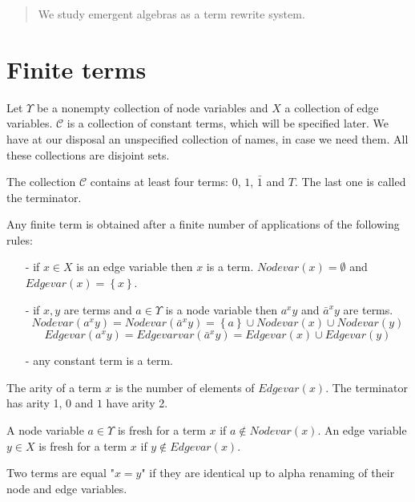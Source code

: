 \documentclass{article}
\begin{document}
\date{This version: 21.05.2018}






\maketitle


\begin{abstract}
We study emergent algebras as a term rewrite system. 

\end{abstract}







 





\section{Finite terms}

Let $\Upsilon$ be a nonempty collection of node variables and $X$ a collection of edge variables. $\mathcal{C}$ is a collection of constant terms, which will be specified later. We have at our disposal an unspecified collection of names, in case we need them. All these collections are disjoint sets. 

The collection $\mathcal{C}$ contains at least four terms: $0$, $1$, $\displaystyle \bar{1}$ and $T$. The last one is called the terminator. 



\begin{definition}
Any finite term is obtained after a finite number of applications of the following rules:
\begin{enumerate}
\item[-] if $x \in X$ is an edge variable then $x$ is a term. $Nodevar(x)=\emptyset$ and $Edgevar(x)=\left\{ x \right\}$.
\item[-] if $x,y$ are terms and $a \in \Upsilon$ is a node variable then $\displaystyle a^{x}y$ and $\displaystyle \bar{a}^{x}y$  are terms. 
$$Nodevar\left( a^{x} y \right) = Nodevar\left( \bar{a}^{x} y \right) =  \left\{ a \right\} \cup Nodevar(x) \cup Nodevar(y)$$
$$Edgevar\left( a^{x} y \right) = Edgevarvar\left( \bar{a}^{x} y \right) = Edgevar(x) \cup Edgevar(y)$$
\item[-] any constant term is a term. 
\end{enumerate}

The arity of a term $x$ is the number of elements of $Edgevar(x)$. The terminator has arity 1, $0$ and $1$ have arity 2.

A node variable $a \in \Upsilon$ is fresh for a term $x$ if $\displaystyle a \not \in Nodevar(x)$. An edge variable $y \in X$ is fresh for a term  $x$  if 
$\displaystyle y \not \in Edgevar(x)$.

Two terms are equal "$x=y$" if they are identical up to alpha renaming of their node and edge variables. 
\label{defterms}
\end{definition}
\end{document}
